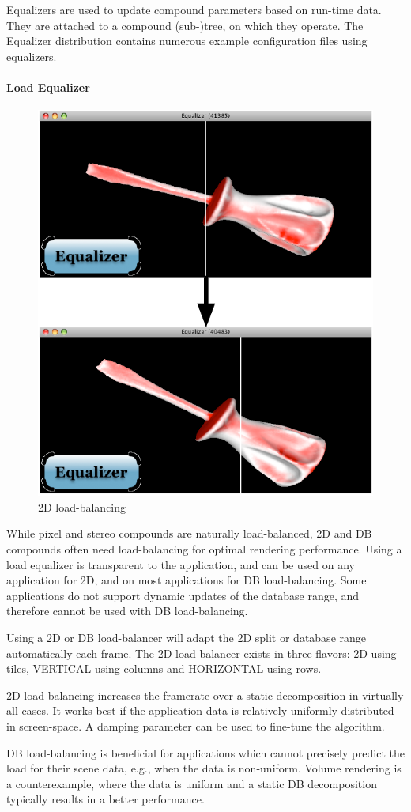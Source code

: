 \documentclass[10pt,a4]{scrartcl}
\begin{document}
Equalizers are used to update compound parameters based on run-time
data. They are attached to a compound (sub-)tree, on which they
operate. The Equalizer distribution contains numerous example
configuration files using equalizers.

\paragraph{Load Equalizer}
\vspace{-2ex}\begin{figure}
  \includegraphics[width=.382\textwidth]{images/lb.pdf}
  {\caption{\label{fLoadBalancing}\small 2D load-balancing}}
\end{figure}
While pixel and stereo compounds are naturally load-balanced, 2D and DB
compounds often need load-balancing for optimal rendering
performance. Using a load equalizer is transparent to the application,
and can be used on any application for 2D, and on most applications for
DB load-balancing. Some applications do not support dynamic updates of
the database range, and therefore cannot be used with DB load-balancing.

Using a 2D or DB load-balancer will adapt the 2D split or database range
automatically each frame. The 2D load-balancer exists in three flavors:
\textsf{2D} using tiles, \textsf{VERTICAL} using columns and
\textsf{HORIZONTAL} using rows.

2D load-balancing increases the framerate over a static decomposition in
virtually all cases. It works best if the application data is relatively
uniformly distributed in screen-space. A damping parameter can be used
to fine-tune the algorithm.

DB load-balancing is beneficial for applications which cannot precisely
predict the load for their scene data, e.g., when the data is
non-uniform. Volume rendering is a counterexample, where the data is
uniform and a static DB decomposition typically results in a better
performance.
\end{document}
